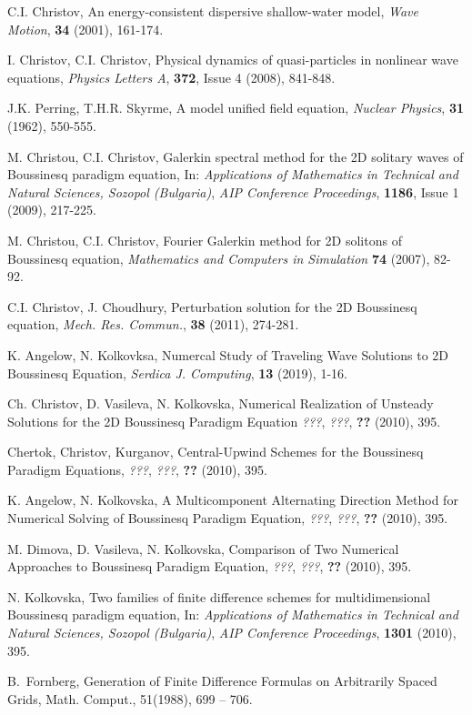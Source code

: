 \documentclass[%
 aip,
cp,  %
 amsmath,amssymb,%
 reprint,%
]{revtex4-2}
\begin{document}
\begin{thebibliography}{99} \normalsize

 C.I. Christov, An energy-consistent dispersive shallow-water model,  {\it Wave Motion}, \textbf{34} (2001), 161-174.

 I. Christov, C.I. Christov, Physical dynamics of quasi-particles in nonlinear wave equations,
{\it Physics Letters A}, \textbf{372}, Issue 4 (2008),  841-848.

 J.K. Perring, T.H.R. Skyrme, A model unified field equation, {\it Nuclear Physics},  \textbf{31} (1962), 550-555.

   M. Christou, C.I. Christov,
Galerkin spectral method for the 2D solitary waves of Boussinesq paradigm equation,
In: {\it Applications of Mathematics in Technical and Natural Sciences, Sozopol (Bulgaria)},
\emph{AIP Conference Proceedings}, \textbf{1186}, Issue 1 (2009), 217-225.

  M. Christou, C.I. Christov,
Fourier Galerkin method for 2D solitons of Boussinesq equation,
{\it Mathematics and Computers in Simulation} \textbf{74} (2007), 82-92.

 C.I. Christov, J. Choudhury, Perturbation solution for the 2D Boussinesq equation, {\it Mech. Res. Commun.}, \textbf{38} (2011), 274-281.

  K. Angelow, N. Kolkovksa, Numercal Study of Traveling Wave Solutions to 2D Boussinesq Equation, {\it Serdica J. Computing}, \textbf{13} (2019), 1-16.

 Ch. Christov, D. Vasileva, N. Kolkovska, Numerical Realization of Unsteady Solutions for the 2D Boussinesq Paradigm Equation
{\it ???},
\emph{???}, \textbf{??} (2010), 395.

 Chertok, Christov, Kurganov, Central-Upwind Schemes for the Boussinesq Paradigm Equations,
{\it ???},
\emph{???}, \textbf{??} (2010), 395.

 K. Angelow, N. Kolkovska, A Multicomponent Alternating Direction Method for Numerical Solving of Boussinesq Paradigm Equation,
{\it ???},
\emph{???}, \textbf{??} (2010), 395.

 M. Dimova, D. Vasileva, N. Kolkovska, Comparison of Two Numerical Approaches to Boussinesq Paradigm Equation,
{\it ???},
\emph{???}, \textbf{??} (2010), 395.

 N. Kolkovska, Two families of finite difference schemes for multidimensional Boussinesq paradigm equation, In:
{\it Applications of Mathematics in Technical and Natural Sciences,  Sozopol (Bulgaria)},
\emph{AIP Conference Proceedings}, \textbf{1301} (2010), 395.

B.~Fornberg, Generation of Finite Difference Formulas on Arbitrarily Spaced Grids, 
Math. Comput., 51(1988),  699 -- 706.

%
\end{thebibliography}
\end{document}
